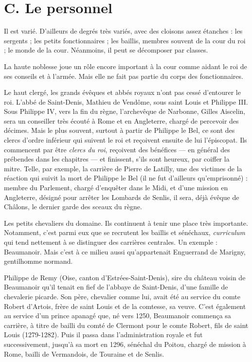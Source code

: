 \documentclass[french,twoside]{book} %
\begin{document}
\section[C. Le personnel]{C. Le personnel}
\label{c04c}
\noindent Il est varié. D’ailleurs de degrés très variés, avec des cloisons assez étanches : les sergents ; les petits fonctionnaires ; les baillis, membres souvent de la cour du roi ; le monde de la cour. Néanmoins, il peut se décomposer par classes.\par
La haute noblesse joue un rôle encore important à la cour comme aidant le roi de ses conseils et à l’armée. Mais elle ne fait pas partie du corps des fonctionnaires.\par
Le haut clergé, les grands évêques et abbés royaux n’ont pas cessé d’entourer le roi. L’abbé de Saint-Denis, Mathieu de Vendôme, sous saint Louis et Philippe III. Sous Philippe IV, vers la fin du règne, l’archevêque de Narbonne, Gilles Aiscelin, sera un conseiller très écouté à Rome et en Angleterre, chargé de percevoir des décimes. Mais le plus souvent, surtout à partir de Philippe le Bel, ce sont des clercs d’ordre inférieur qui suivent le roi et reçoivent ensuite de lui l’épiscopat. Ils commencent par être \emph{clercs du roi}, reçoivent des bénéfices — en général des prébendes dans les chapitres — et finissent, s’ils sont heureux, par coiffer la mitre. Telle, par exemple, la carrière de Pierre de Latilly, une des victimes de la réaction qui suivit la mort de Philippe le Bel (il ne fut d’ailleurs qu’emprisonné) : membre du Parlement, chargé d’enquêter dans le Midi, et d’une mission en Angleterre, désigné pour arrêter les Lombards de Senlis, il sera, déjà évêque de Châlons, le dernier garde des sceaux du règne.\par
Les petits chevaliers du domaine. Ils continuent à tenir une place très importante. Notamment, c’est parmi eux que se recrutent les baillis et sénéchaux, {\itshape curriculum} qui tend nettement à se distinguer des carrières centrales. Un exemple : Beaumanoir. Mais c’est à ce milieu aussi qu’appartenait Enguerrand de Marigny, gentilhomme normand.\par
\label{p41} Philippe de Remy (Oise, canton d’Estrées-Saint-Denis), sire du château voisin de Beaumanoir qu’il tenait en fief de l’abbaye de Saint-Denis, d’une famille de chevalerie picarde. Son père, chevalier comme lui, avait été au service du comte Robert d’Artois, frère de saint Louis et de la comtesse, sa veuve. C’est également au service d’un prince apanagé que, né vers 1250, Beaumanoir commença sa carrière, à titre de bailli du comté de Clermont pour le comte Robert, fils de saint Louis (1279-1282). Puis il passa dans l’administration royale et fut successivement, jusqu’à sa mort en 1296, sénéchal du Poitou, chargé de mission à Rome, bailli de Vermandois, de Touraine et de Senlis.\par
\end{document}
